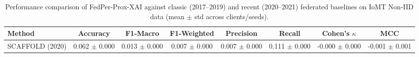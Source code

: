 \begin{table}[t]
\centering
\caption{Performance comparison of FedPer-Prox-XAI against classic (2017--2019) and recent (2020--2021) federated baselines on IoMT Non-IID data (mean $\pm$ std across clients/seeds).}
\label{tab:sota_comparison}
\begin{tabular}{lccccccc}
\toprule
Method & Accuracy & F1-Macro & F1-Weighted & Precision & Recall & Cohen's $\kappa$ & MCC \\
\midrule
SCAFFOLD (2020) & 0.062 $\pm$ 0.000 & 0.013 $\pm$ 0.000 & 0.007 $\pm$ 0.000 & 0.007 $\pm$ 0.000 & 0.111 $\pm$ 0.000 & -0.000 $\pm$ 0.000 & -0.001 $\pm$ 0.001 \\
\bottomrule
\end{tabular}
\end{table}
